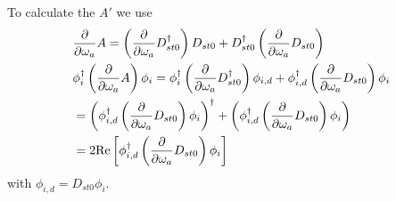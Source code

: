 To calculate the $A'$ we use
\begin{equation}
\begin{split}
&\frac{\partial }{\partial \omega _a}A = \left(\frac{\partial }{\partial \omega _a}D^{\dagger}_{st0}\right)D_{st0}+D^{\dagger}_{st0}\left(\frac{\partial }{\partial \omega _a}D_{st0}\right)\\
&\phi _i^{\dagger}\left(\frac{\partial }{\partial \omega _a}A\right)\phi _i=\phi _i^{\dagger}\left(\frac{\partial }{\partial \omega _a}D^{\dagger}_{st0}\right)\phi _{i,d}+\phi _{i,d}^{\dagger}\left(\frac{\partial }{\partial \omega _a}D_{st0}\right)\phi _i\\
&=\left(\phi _{i,d}^{\dagger}\left(\frac{\partial }{\partial \omega _a}D_{st0}\right)\phi _i\right)^{\dagger}+\left(\phi _{i,d}^{\dagger}\left(\frac{\partial }{\partial \omega _a}D_{st0}\right)\phi _i\right)\\
&=2{\rm Re}\left[\phi _{i,d}^{\dagger}\left(\frac{\partial }{\partial \omega _a}D_{st0}\right)\phi _i\right]
\end{split}
\end{equation}
with $\phi _{i,d}=D_{st0}\phi _i$.

